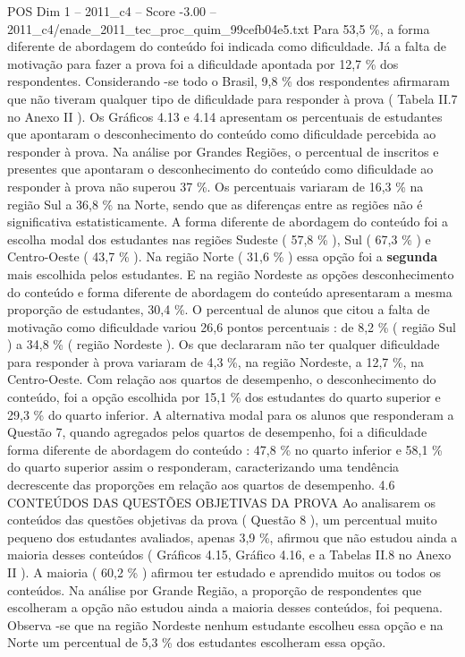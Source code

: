 \begin{textsample}{POS Dim 1 – 2011\_c4 – Score -3.00 – 2011\_c4/enade\_2011\_tec\_proc\_quim\_99cefb04e5.txt}
Para 53,5 \%, a forma diferente de abordagem do conteúdo foi indicada como dificuldade.
Já a falta de motivação para fazer a prova foi a dificuldade apontada por 12,7 \% dos respondentes.
Considerando -se todo o Brasil, 9,8 \% dos respondentes afirmaram que não tiveram qualquer tipo de dificuldade para responder à prova ( Tabela II.7 no Anexo II ).
Os Gráficos 4.13 e 4.14 apresentam os percentuais de estudantes que apontaram o desconhecimento do conteúdo como dificuldade percebida ao responder à prova.
Na análise por Grandes Regiões, o percentual de inscritos e presentes que apontaram o desconhecimento do conteúdo como dificuldade ao responder à prova não superou 37 \%.
Os percentuais variaram de 16,3 \% na região Sul a 36,8 \% na Norte, sendo que as diferenças entre as regiões não é significativa estatisticamente.
A forma diferente de abordagem do conteúdo foi a escolha modal dos estudantes nas regiões Sudeste ( 57,8 \% ), Sul ( 67,3 \% ) e Centro-Oeste ( 43,7 \% ).
Na região Norte ( 31,6 \% ) essa opção foi a \textbf{segunda} mais escolhida pelos estudantes.
E na região Nordeste as opções desconhecimento do conteúdo e forma diferente de abordagem do conteúdo apresentaram a mesma proporção de estudantes, 30,4 \%.
O percentual de alunos que citou a falta de motivação como dificuldade variou 26,6 pontos percentuais : de 8,2 \% ( região Sul ) a 34,8 \% ( região Nordeste ).
Os que declararam não ter qualquer dificuldade para responder à prova variaram de 4,3 \%, na região Nordeste, a 12,7 \%, na Centro-Oeste.
Com relação aos quartos de desempenho, o desconhecimento do conteúdo, foi a opção escolhida por 15,1 \% dos estudantes do quarto superior e 29,3 \% do quarto inferior.
A alternativa modal para os alunos que responderam a Questão 7, quando agregados pelos quartos de desempenho, foi a dificuldade forma diferente de abordagem do conteúdo : 47,8 \% no quarto inferior e 58,1 \% do quarto superior assim o responderam, caracterizando uma tendência decrescente das proporções em relação aos quartos de desempenho. 4.6 CONTEÚDOS DAS QUESTÕES OBJETIVAS DA PROVA Ao analisarem os conteúdos das questões objetivas da prova ( Questão 8 ), um percentual muito pequeno dos estudantes avaliados, apenas 3,9 \%, afirmou que não estudou ainda a maioria desses conteúdos ( Gráficos 4.15, Gráfico 4.16, e a Tabelas II.8 no Anexo II ).
A maioria ( 60,2 \% ) afirmou ter estudado e aprendido muitos ou todos os conteúdos.
Na análise por Grande Região, a proporção de respondentes que escolheram a opção não estudou ainda a maioria desses conteúdos, foi pequena.
Observa -se que na região Nordeste nenhum estudante escolheu essa opção e na Norte um percentual de 5,3 \% dos estudantes escolheram essa opção.

\end{textsample}
